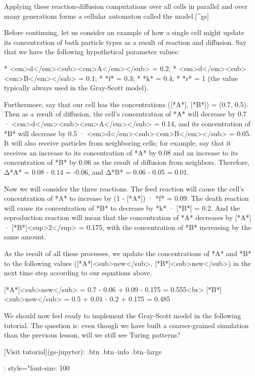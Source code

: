 {{{{{{{{{{Applying these reaction-diffusion computations over all cells in parallel and over many generations forms a cellular automaton called the  model.[^gs]

Before continuing, let us consider an example of how a single cell might update its concentration of both particle types as a result of reaction and diffusion.  Say that we have the following hypothetical parameter values:

* <em>d</em><sub><em>A</em></sub> = 0.2;
* <em>d</em><sub><em>B</em></sub> = 0.1;
* *f* = 0.3;
* *k* = 0.4;
* *r* = 1 (the value typically always used in the Gray-Scott model).

Furthermore, say that our cell has the concentrations ([*A*], [*B*]) = (0.7, 0.5). Then as a result of diffusion, the cell's concentration of *A* will decrease by 0.7 · <em>d</em><sub><em>A</em></sub> = 0.14, and its concentration of *B* will decrease by 0.5 · <em>d</em><sub><em>B</em></sub> = 0.05. It will also receive particles from neighboring cells; for example, say that it receives an increase to its concentration of *A* by 0.08 and an increase to its concentration of *B* by 0.06 as the result of diffusion from neighbors. Therefore, Δ*A* = 0.08 - 0.14 = -0.06, and Δ*B* = 0.06 - 0.05 = 0.01.

Now we will consider the three reactions. The feed reaction will cause the cell's concentration of *A* to increase by (1 - [*A*]) · *f* = 0.09. The death reaction will cause its concentration of *B* to decrease by *k* · [*B*] = 0.2. And the reproduction reaction will mean that the concentration of *A* decreases by [*A*] · [*B*]<sup>2</sup> = 0.175, with the concentration of *B* increasing by the same amount.

As the result of all these processes, we update the concentrations of *A* and *B* to the following values ([*A*]<sub>new</sub>, [*B*]<sub>new</sub>) in the next time step according to our equations above.

[*A*]<sub>new</sub> = 0.7 - 0.06 + 0.09 - 0.175 = 0.555<br>
[*B*]<sub>new</sub> = 0.5 + 0.01 - 0.2 + 0.175 = 0.485

We should now feel ready to implement the Gray-Scott model in the following tutorial. The question is: even though we have built a coarser-grained simulation than the previous lesson, will we still see Turing patterns?

[Visit tutorial](gs-jupyter){: .btn .btn--info .btn--large}
{: style="font-size: 100%

}}}}}}}}}}}
